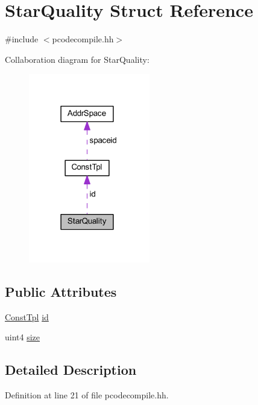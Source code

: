 \hypertarget{struct_star_quality}{}\section{Star\+Quality Struct Reference}
\label{struct_star_quality}


{\ttfamily \#include $<$pcodecompile.\+hh$>$}



Collaboration diagram for Star\+Quality\+:
\nopagebreak
\begin{figure}[H]
\begin{center}
\leavevmode
\includegraphics[width=150pt]{struct_star_quality__coll__graph}
\end{center}
\end{figure}
\subsection*{Public Attributes}
\begin{DoxyCompactItemize}
\item 
\mbox{\hyperlink{class_const_tpl}{Const\+Tpl}} \mbox{\hyperlink{struct_star_quality_a557bd6565a0049fc69817cebe9899906}{id}}
\item 
uint4 \mbox{\hyperlink{struct_star_quality_a9e229c08a26a7f9f789660f694b57547}{size}}
\end{DoxyCompactItemize}


\subsection{Detailed Description}


Definition at line 21 of file pcodecompile.\+hh.



